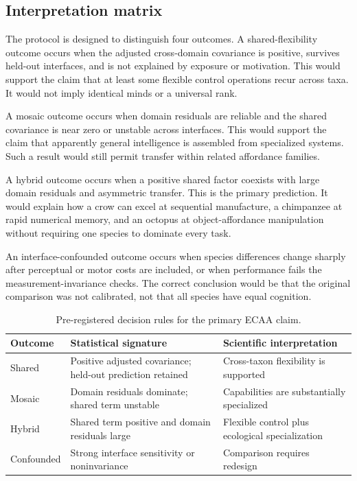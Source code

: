 \documentclass[conference]{IEEEtran}
\begin{document}
\subsection{Interpretation matrix}
The protocol is designed to distinguish four outcomes. A shared-flexibility outcome occurs when the adjusted cross-domain covariance is positive, survives held-out interfaces, and is not explained by exposure or motivation. This would support the claim that at least some flexible control operations recur across taxa. It would not imply identical minds or a universal rank.

A mosaic outcome occurs when domain residuals are reliable and the shared covariance is near zero or unstable across interfaces. This would support the claim that apparently general intelligence is assembled from specialized systems. Such a result would still permit transfer within related affordance families.

A hybrid outcome occurs when a positive shared factor coexists with large domain residuals and asymmetric transfer. This is the primary prediction. It would explain how a crow can excel at sequential manufacture, a chimpanzee at rapid numerical memory, and an octopus at object-affordance manipulation without requiring one species to dominate every task.

An interface-confounded outcome occurs when species differences change sharply after perceptual or motor costs are included, or when performance fails the measurement-invariance checks. The correct conclusion would be that the original comparison was not calibrated, not that all species have equal cognition.

\begin{table}[t]
\centering
\caption{Pre-registered decision rules for the primary ECAA claim.}
\label{tab:decisions}
\footnotesize
\begin{tabular}{p{2.1cm}p{2.4cm}p{2.5cm}}
\toprule
Outcome & Statistical signature & Scientific interpretation \\ 
\midrule
Shared & Positive adjusted covariance; held-out prediction retained & Cross-taxon flexibility is supported \\ 
Mosaic & Domain residuals dominate; shared term unstable & Capabilities are substantially specialized \\ 
Hybrid & Shared term positive and domain residuals large & Flexible control plus ecological specialization \\ 
Confounded & Strong interface sensitivity or noninvariance & Comparison requires redesign \\ 
\bottomrule
\end{tabular}
\end{table}
\end{document}
